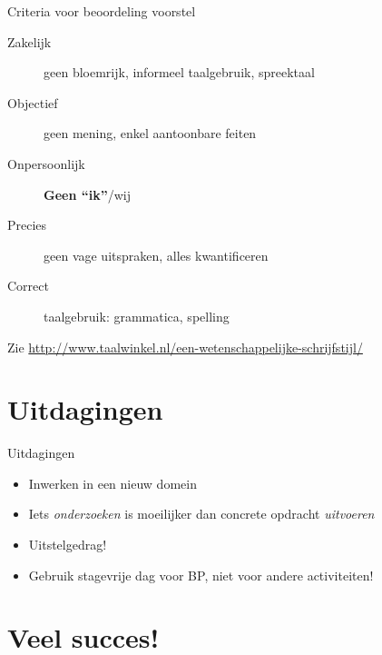 \documentclass[aspectratio=169,usenames,dvipsnames]{beamer}
\begin{document}
\begin{frame}{Criteria voor beoordeling voorstel}


\begin{description}
  \item[Zakelijk] geen bloemrijk, informeel taalgebruik, spreektaal
  \item[Objectief] geen mening, enkel aantoonbare feiten
  \item[Onpersoonlijk] \textbf{Geen ``ik''}/wij
  \item[Precies] geen vage uitspraken, alles kwantificeren
  \item[Correct] taalgebruik: grammatica, spelling
\end{description}

Zie \url{http://www.taalwinkel.nl/een-wetenschappelijke-schrijfstijl/}

\end{frame}

\section{Uitdagingen}

\begin{frame}{Uitdagingen}

\begin{itemize}
  \item Inwerken in een nieuw domein
  \item Iets \emph{onderzoeken} is moeilijker dan concrete opdracht \emph{uitvoeren}
  \item Uitstelgedrag!
  \item Gebruik stagevrije dag voor BP, niet voor andere activiteiten!
\end{itemize}

\end{frame}



\section{Veel succes!}
\end{document}
